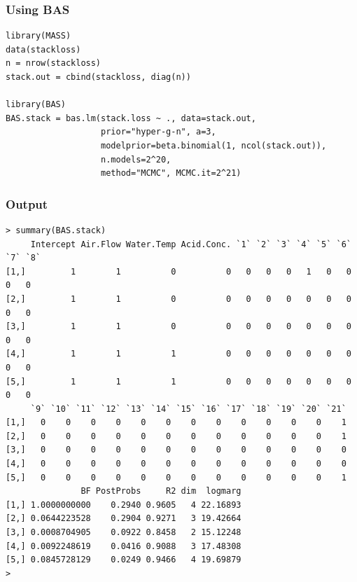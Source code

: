 \documentclass[]{beamer}
\begin{document}
\begin{frame}[fragile] \frametitle{Using BAS}
\begin{verbatim}
library(MASS)
data(stackloss)
n = nrow(stackloss)
stack.out = cbind(stackloss, diag(n))

library(BAS)
BAS.stack = bas.lm(stack.loss ~ ., data=stack.out,
                   prior="hyper-g-n", a=3, 
                   modelprior=beta.binomial(1, ncol(stack.out)),
                   n.models=2^20,
                   method="MCMC", MCMC.it=2^21)
\end{verbatim}
\end{frame}
\begin{frame}[fragile]\frametitle{Output}
  \begin{tiny}
\begin{verbatim}
> summary(BAS.stack)
     Intercept Air.Flow Water.Temp Acid.Conc. `1` `2` `3` `4` `5` `6` `7` `8`
[1,]         1        1          0          0   0   0   0   1   0   0   0   0
[2,]         1        1          0          0   0   0   0   0   0   0   0   0
[3,]         1        1          0          0   0   0   0   0   0   0   0   0
[4,]         1        1          1          0   0   0   0   0   0   0   0   0
[5,]         1        1          1          0   0   0   0   0   0   0   0   0
     `9` `10` `11` `12` `13` `14` `15` `16` `17` `18` `19` `20` `21`
[1,]   0    0    0    0    0    0    0    0    0    0    0    0    1
[2,]   0    0    0    0    0    0    0    0    0    0    0    0    1
[3,]   0    0    0    0    0    0    0    0    0    0    0    0    0
[4,]   0    0    0    0    0    0    0    0    0    0    0    0    0
[5,]   0    0    0    0    0    0    0    0    0    0    0    0    1
               BF PostProbs     R2 dim  logmarg
[1,] 1.0000000000    0.2940 0.9605   4 22.16893
[2,] 0.0644223528    0.2904 0.9271   3 19.42664
[3,] 0.0008704905    0.0922 0.8458   2 15.12248
[4,] 0.0092248619    0.0416 0.9088   3 17.48308
[5,] 0.0845728129    0.0249 0.9466   4 19.69879
>
\end{verbatim}
    
  \end{tiny}

\end{frame}
\end{document}
